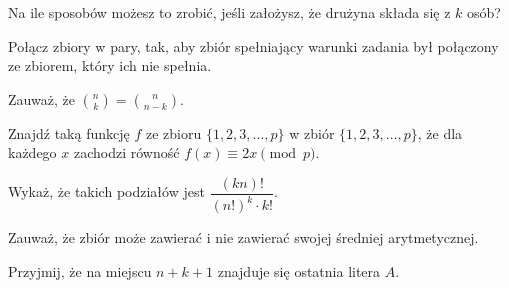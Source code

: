 
\begin{hints_list}
	\item Na ile sposobów możesz to zrobić, jeśli założysz, że drużyna składa się z $k$ osób?
	\item Połącz zbiory w pary, tak, aby zbiór spełniający warunki zadania był połączony ze zbiorem, który ich nie spełnia.
	\item Zauważ, że ${{n}\choose{k}} = {{n}\choose{n - k}}$.
	\item Znajdź taką funkcję $f$ ze zbioru $\{1, 2, 3,..., p\}$ w zbiór $\{1, 2, 3,..., p\}$, że dla każdego $x$ zachodzi równość $f(x) \equiv 2x \pmod{p}$.
	\item Wykaż, że takich podziałów jest $\dfrac{(kn)!}{(n!)^k \cdot k!}$.
	\item Zauważ, że zbiór może zawierać i nie zawierać swojej średniej arytmetycznej.
	\item Przyjmij, że na miejscu $n + k + 1$ znajduje się ostatnia litera $A$.
\end{hints_list}